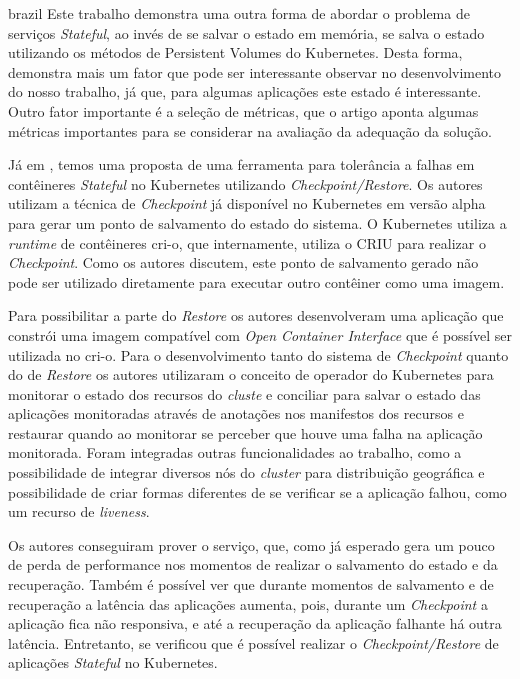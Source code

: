 \begin{otherlanguage*}{brazil}
Este trabalho demonstra uma outra forma de abordar o problema de serviços
\textit{Stateful}, ao invés de se salvar o estado em memória, se salva o
estado utilizando os métodos de Persistent Volumes do Kubernetes. Desta
forma, demonstra mais um fator que pode ser interessante observar no
desenvolvimento do nosso trabalho, já que, para algumas aplicações este
estado é interessante. Outro fator importante é a seleção de métricas, que
o artigo aponta algumas métricas importantes para se considerar na avaliação
da adequação da solução.

Já em \cite{schmidttransparent}, temos uma proposta de uma ferramenta para
tolerância a falhas em contêineres \textit{Stateful} no Kubernetes utilizando
\textit{Checkpoint/Restore}. Os autores utilizam a técnica de \textit{Checkpoint}
já disponível no Kubernetes em versão alpha para gerar um ponto de salvamento
do estado do sistema. O Kubernetes utiliza a \textit{runtime} de contêineres
cri-o\cite{cri-o}, que internamente, utiliza o CRIU\cite{criu} para realizar
o \textit{Checkpoint}. Como os autores discutem, este ponto de salvamento
gerado não pode ser utilizado diretamente para executar outro contêiner como
uma imagem.

Para possibilitar a parte do \textit{Restore} os autores desenvolveram uma
aplicação que constrói uma imagem compatível com \textit{Open Container Interface}
que é possível ser utilizada no cri-o. Para o desenvolvimento tanto do sistema
de \textit{Checkpoint} quanto do de \textit{Restore} os autores utilizaram o
conceito de operador do Kubernetes para monitorar o estado dos recursos do 
\textit{cluste} e conciliar para salvar o estado das aplicações monitoradas
através de anotações nos manifestos dos recursos e restaurar quando ao monitorar
se perceber que houve uma falha na aplicação monitorada. Foram integradas outras
funcionalidades ao trabalho, como a possibilidade de integrar diversos nós do
\textit{cluster} para distribuição geográfica e possibilidade de criar formas
diferentes de se verificar se a aplicação falhou, como um recurso de
\textit{liveness}.

Os autores conseguiram prover o serviço, que, como já esperado gera um pouco
de perda de performance nos momentos de realizar o salvamento do estado e da
recuperação. Também é possível ver que durante momentos de salvamento e de
recuperação a latência das aplicações aumenta, pois, durante um
\textit{Checkpoint} a aplicação fica não responsiva, e até a recuperação da
aplicação falhante há outra latência. Entretanto, se verificou que é possível
realizar o \textit{Checkpoint/Restore} de aplicações \textit{Stateful} no
Kubernetes.


\end{otherlanguage*}
